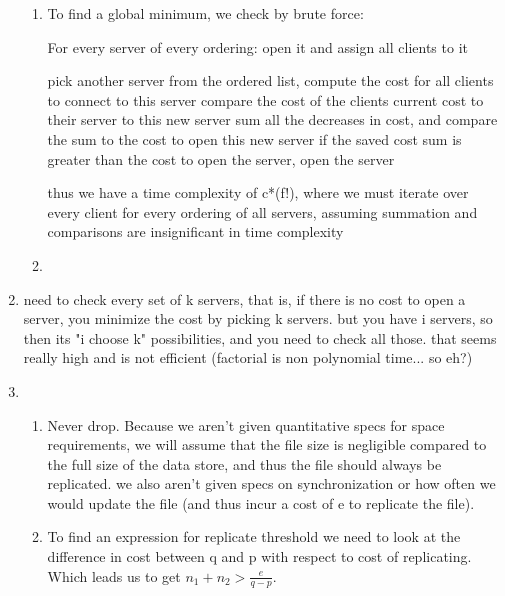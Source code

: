 \documentclass{article}
\begin{document}
\begin{enumerate}
	\begin{enumerate}

		\item 

To find a global minimum, we check by brute force:

For every server of every ordering:
	open it and assign all clients to it
	
	pick another server from the ordered list, 
		compute the cost for all clients to connect to this server
		compare the cost of the clients current cost to their server to this new server
		sum all the decreases in cost, and compare the sum to the cost to open this new server
		if the saved cost sum is greater than the cost to open the server, open the server

thus we have a time complexity of c*(f!), where we must iterate over every client for every ordering of all servers, assuming summation and comparisons are insignificant in time complexity

		\item



	\end{enumerate}

	\item  

need to check every set of k servers, that is, if there is no cost to open a server, you minimize the cost by picking k servers. but you have i servers, so then its "i choose k" possibilities, and you need to check all those. that seems really high and is not efficient (factorial is non polynomial time... so eh?)

	\item  

	\begin{enumerate}

		\item 

Never drop. Because we aren't given quantitative specs for space requirements, we will assume that the file size is negligible compared to the full size of the data store, and thus the file should always be replicated. we also aren't given specs on synchronization or how often we would update the file (and thus incur a cost of e to replicate the file).

		\item 
To find an expression for replicate threshold we need to look at the difference in cost between q and p with respect to cost of replicating. Which leads us to get \(n_1+n_2>\frac{e}{q-p} \).


\end{enumerate}
\end{enumerate}
\end{document}
